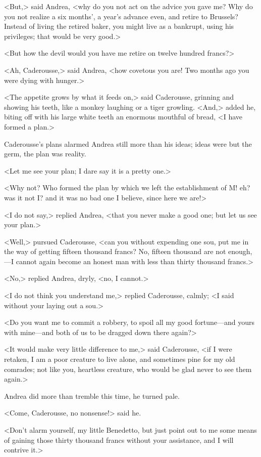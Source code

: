  <But,> said Andrea, <why do you not act on the advice you gave me? Why do you not realize a six months', a year's advance even, and retire to Brussels? Instead of living the retired baker, you might live as a bankrupt, using his privileges; that would be very good.> 

 <But how the devil would you have me retire on twelve hundred francs?> 

 <Ah, Caderousse,> said Andrea, <how covetous you are! Two months ago you were dying with hunger.> 

 <The appetite grows by what it feeds on,> said Caderousse, grinning and showing his teeth, like a monkey laughing or a tiger growling. <And,> added he, biting off with his large white teeth an enormous mouthful of bread, <I have formed a plan.> 

 Caderousse's plans alarmed Andrea still more than his ideas; ideas were but the germ, the plan was reality. 

 <Let me see your plan; I dare say it is a pretty one.> 

 <Why not? Who formed the plan by which we left the establishment of M\doubleemdash ! eh? was it not I? and it was no bad one I believe, since here we are!> 

 <I do not say,> replied Andrea, <that you never make a good one; but let us see your plan.> 

 <Well,> pursued Caderousse, <can you without expending one sou, put me in the way of getting fifteen thousand francs? No, fifteen thousand are not enough,—I cannot again become an honest man with less than thirty thousand francs.> 

 <No,> replied Andrea, dryly, <no, I cannot.> 

 <I do not think you understand me,> replied Caderousse, calmly; <I said without your laying out a sou.> 

 <Do you want me to commit a robbery, to spoil all my good fortune—and yours with mine—and both of us to be dragged down there again?> 

 <It would make very little difference to me,> said Caderousse, <if I were retaken, I am a poor creature to live alone, and sometimes pine for my old comrades; not like you, heartless creature, who would be glad never to see them again.> 

 Andrea did more than tremble this time, he turned pale. 

 <Come, Caderousse, no nonsense!> said he. 

 <Don't alarm yourself, my little Benedetto, but just point out to me some means of gaining those thirty thousand francs without your assistance, and I will contrive it.> 

